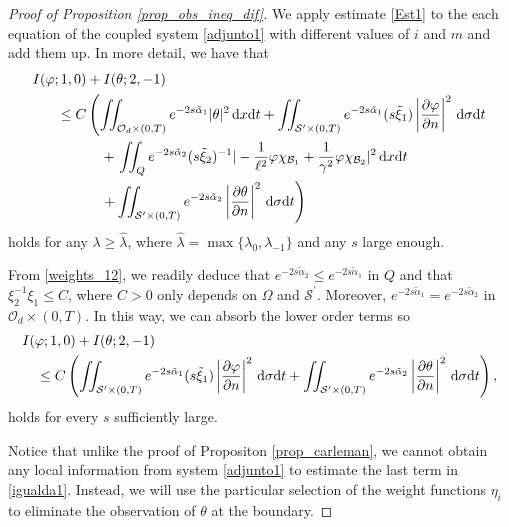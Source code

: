 \documentclass{aims}
\theoremstyle{definition}
\newcommand\csin[1]{\chi_{#1}}
\def\dx{\,\textnormal{d}x}
\def\dt{\textnormal{d}t}
\def\d{\,\textnormal{d}}
\begin{document}
\begin{proof}[Proof of Proposition \ref{prop_obs_ineq_dif}]
We apply estimate \eqref{Est1} to the each equation of the coupled system \eqref{adjunto1} with different values of $i$ and $m$ and add them up. In more detail, we have that
%
\begin{align}\notag
I(\varphi;1,0)&+I(\theta;2, -1)\\\notag
\leq C&\left(\iint_{\mathcal O_d\times(0,T)}e^{-2s\tilde{\alpha}_1}|\theta|^2\dx\dt+\iint_{\mathcal S^\prime\times(0,T)}e^{-2s\tilde{\alpha}_1}(s\tilde{\xi}_1)\left|\frac{\partial \varphi}{\partial n}\right|^2\d\sigma\dt\right.\\ \notag
&\quad+\left.\iint_{Q}e^{-2s\tilde{\alpha}_2}(s\tilde{\xi}_2)^{-1}|-\frac{1}{\ell^2}\varphi\csin{\mathcal B_1}+\frac{1}{\gamma^2}\varphi \csin{\mathcal B_2}|^2\dx\dt\right. \\ \notag
&\quad\left.+\iint_{\mathcal S^\prime\times(0,T)}e^{-2s\tilde{\alpha}_2}\left|\frac{\partial \theta}{\partial n}\right|^2\d\sigma\dt\right)
\end{align}
%
holds for any $\lambda\geq\hat\lambda$, where $\hat{\lambda}=\max\{\lambda_0,\lambda_{-1}\}$ and any $s$ large enough.

From \eqref{weights_12}, we readily deduce that $e^{-2s\tilde\alpha_2}\leq e^{-2s\tilde\alpha_1}$ in $Q$ and that $\xi_2^{-1}\xi_1\leq C$, where $C>0$ only depends on $\Omega$ and $\mathcal S^\prime$. Moreover, $e^{-2s\tilde\alpha_1}=e^{-2s\tilde\alpha_2}$ in  $\mathcal O_d\times(0,T)$. In this way, we can absorb the lower order terms so 
%
\begin{align}\notag
&I(\varphi;1,0)+I(\theta;2, -1)\\ \label{igualda1}
&\quad \leq C\left(\iint_{\mathcal S^{\prime}\times(0,T)}e^{-2s\tilde{\alpha}_1}(s\tilde{\xi}_1)\left|\frac{\partial \varphi}{\partial n}\right|^2\d\sigma\dt+\iint_{\mathcal S^\prime\times(0,T)}e^{-2s\tilde{\alpha}_2}\left|\frac{\partial \theta}{\partial n}\right|^2\d\sigma\dt\right),
\end{align}
holds for every $s$ sufficiently large.

 Notice that unlike the proof of Propositon \ref{prop_carleman}, we cannot obtain any local information from system \eqref{adjunto1} to estimate the last term in \eqref{igualda1}. Instead, we will use the particular selection of the weight functions $\eta_i$ to eliminate the observation of $\theta$ at the boundary.
 

\end{proof}
\end{document}
